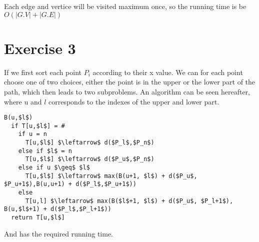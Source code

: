 \documentclass[12pt,a4paper]{report}
\begin{document}
Each edge and vertice will be visited maximum once, so the running time is be $O(|G.V| + |G.E|)$

\section*{Exercise 3}
If we first sort each point $P_i$ according to their x value. We can for each point choose one of two choices, either the point is in the upper or the lower part of the path, which then leads to two subproblems.
An algorithm can be seen hereafter, where u and $l$ corresponds to the indexes of the upper and lower part.
\begin{lstlisting}
B(u,$l$)
  if T[u,$l$] = #
    if u = n
  	  T[u,$l$] $\leftarrow$ d($P_l$,$P_n$) 	
    else if $l$ = n
  	  T[u,$l$] $\leftarrow$ d($P_u$,$P_n$)
    else if u $\geq$ $l$
      T[u,$l$] $\leftarrow$ max(B(u+1, $l$) + d($P_u$, $P_u+1$),B(u,u+1) + d($P_l$,$P_u+1$))
    else
      T[u,l] $\leftarrow$ max(B($l$+1, $l$) + d($P_u$, $P_l+1$), B(u,$l$+1) + d($P_l$,$P_l+1$))
  return T[u,$l$]
\end{lstlisting}

And has the required running time.
\end{document}
